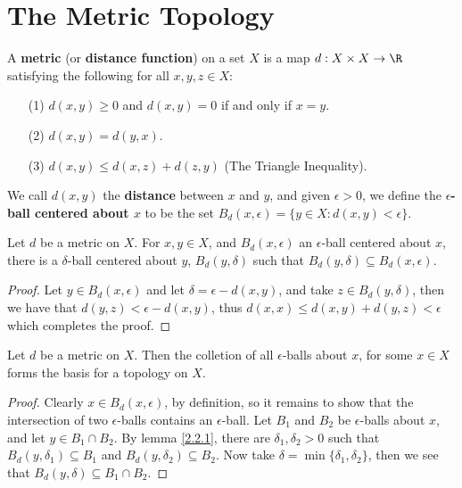
\section{The Metric Topology}

\begin{definition}
    A \textbf{metric} (or \textbf{distance function}) on a set $X$ is a map  $d:X \times X
    \rightarrow \R$ satisfying the following for all $x,y,z \in X$:
        \begin{enumerate}
            \item[(1)] $d(x,y) \geq 0$ and $d(x,y)=0$ if and only if $x=y$.

            \item[(2)] $d(x,y)=d(y,x)$.

            \item[(3)]$d(x,y) \leq d(x,z)+d(z,y)$ (The Triangle Inequality).
        \end{enumerate}
        We call $d(x,y)$ the \textbf{distance} between $x$ and  $y$, and given  $\epsilon>0$, we
    define the  \textbf{$\epsilon$-ball centered about $x$} to be the set $B_d(x,\epsilon)=\{y \in
    X: d(x,y)<\epsilon\}$.
\end{definition}

\begin{lemma}\label{2.2.1}
    Let $d$ be a metric on  $X$. For  $x,y \in X$, and  $B_d(x,\epsilon)$ an $\epsilon$-ball
    centered about  $x$, there is a  $\delta$-ball centered about  $y$,  $B_d(y,\delta)$ such that
    $B_d(y,\delta) \subseteq B_d(x,\epsilon)$.
\end{lemma}
\begin{proof}
    Let $y \in B_d(x,\epsilon)$ and let $\delta=\epsilon-d(x,y)$, and take $z \in B_d(y,\delta)$,
    then we have that $d(y,z)<\epsilon-d(x,y)$, thus $d(x,x) \leq d (x,y)+d(y,z)<\epsilon$ which
    completes the proof.
\end{proof}

\begin{theorem}\label{2.2.2}
    Let $d$ be a metric on  $X$. Then the colletion of all  $\epsilon$-balls about  $x$, for some
    $x \in X$ forms the basis for a topology on  $X$.
\end{theorem}
\begin{proof}
    Clearly $x \in B_d(x,\epsilon)$, by definition, so it remains to show that the intersection of
    two $\epsilon$-balls contains an  $\epsilon$-ball. Let  $B_1$ and $B_2$ be $\epsilon$-balls
    about  $x$, and let  $y \in B_1 \cap B_2$. By lemma \ref{2.2.1}, there are $\delta_1,\delta_2>0$
    such that $B_d(y,\delta_1) \subseteq B_1$ and $B_d(y,\delta_2) \subseteq B_2$. Now take
    $\delta=\min\{\delta_1, \delta_2\}$, then we see that $B_d(y,\delta) \subseteq B_1 \cap B_2$.
\end{proof}

